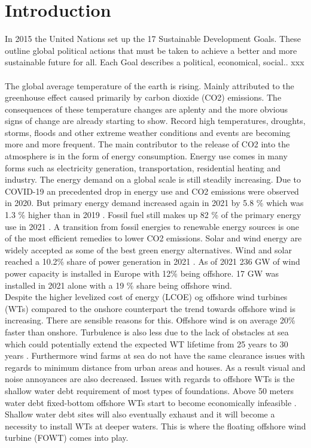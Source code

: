 \section{Introduction} \label{sec:intro}
In 2015 the United Nations set up the 17 Sustainable Development Goals. These outline global political actions that must be taken to achieve a better and more sustainable future for all. Each Goal describes a political, economical, social.. xxx \\ \\


The global average temperature of the earth is rising. Mainly attributed to the greenhouse effect caused primarily by carbon dioxide (CO2) emissions. The consequences of these temperature changes are aplenty and the more obvious signs of change are already starting to show. Record high temperatures, droughts, storms, floods and other extreme weather conditions and events are becoming more and more frequent. The main contributor to the release of CO2 into the atmosphere is in the form of energy consumption. Energy use comes in many forms such as electricity generation, transportation, residential heating and industry. The energy demand on a global scale is still steadily increasing. Due to COVID-19 an precedented drop in energy use and CO2 emissions were observed in 2020. But primary energy demand increased again in 2021 by 5.8 \% which was 1.3 \% higher than in 2019 \cite{bp2022}. Fossil fuel still makes up 82 \% of the primary energy use in 2021 \cite{bp2022}. A transition from fossil energies to renewable energy sources is one of the most efficient remedies to lower CO2 emissions. Solar and wind energy are widely accepted as some of the best green energy alternatives. Wind and solar reached a 10.2\% share of power generation in 2021 \cite{bp2022}. As of 2021 236 GW of wind power capacity is installed in Europe with 12\% being offshore. 17 GW was installed in 2021 alone with a 19 \% share being offshore wind\cite{Sesto1992}. \\

Despite the higher levelized cost of energy (LCOE) og offshore wind turbines (WTs) compared to the onshore counterpart the trend towards offshore wind is increasing. There are sensible reasons for this. Offshore wind is on average 20\% faster than onshore. Turbulence is also less due to the lack of obstacles at sea which could potentially extend the expected WT lifetime from 25 years to 30 years \cite{Christiansen2013}. Furthermore wind farms at sea do not have the same clearance issues with regards to minimum distance from urban areas and houses. As a result visual and noise annoyances are also decreased. Issues with regards to offshore WTs is the shallow water debt requirement of most types of foundations. Above 50 meters water debt fixed-bottom offshore WTs start to become economically infeasible \cite{Lefebvre2012}. Shallow water debt sites will also eventually exhaust and it will become a necessity to install WTs at deeper waters. This is where the floating offshore wind turbine (FOWT) comes into play.

